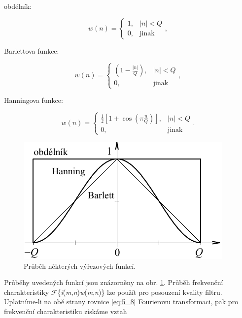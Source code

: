 \noindent obdélník:

\begin{equation} \label{eq:5_13}
    w(n) = \left\{
    \begin{array}{cc}
    1, & |n|<Q \\
    0, & \mathrm{jinak}
    \end{array}
    \right. ,
\end{equation}

\noindent Barlettova funkce:

\begin{equation} \label{eq:5_14}
    w(n) = \left\{
    \begin{array}{cc}
    \left( 1 - \frac{\left| n \right|}{Q} \right) , & |n|<Q \\
    0, & \mathrm{jinak}
    \end{array}
    \right. ,
\end{equation}

\noindent Hanningova funkce:

\begin{equation} \label{eq:5_15}
    w(n) = \left\{
    \begin{array}{cc}
    \frac{1}{2} \left[ 1 + \cos \left( \pi \frac{n}{Q} \right) \right] , & |n|<Q \\
    0, & \mathrm{jinak}
    \end{array}
    \right. .
\end{equation}

\begin{figure}[th]
    \begin{center}
        \includegraphics[scale=1.0]{05_filtrace/images/img_5_1.pdf}
    \end{center}
    \caption{Průběh některých výřezových funkcí.}
    \label{img:5_1}
\end{figure}

Průběhy uvedených funkcí jsou znázorněny na obr. \ref{img:5_1}. Průběh frekvenční charakteristiky $\mathscr{F}$\{\textit{i}(\textit{m},\textit{n})\textit{w}(\textit{m},\textit{n})\} lze použít pro posouzení kvality filtru. Uplatníme-li na obě strany rovnice \eqref{eq:5_8} Fourierovu transformaci, pak pro frekvenční charakteristiku získáme vztah


